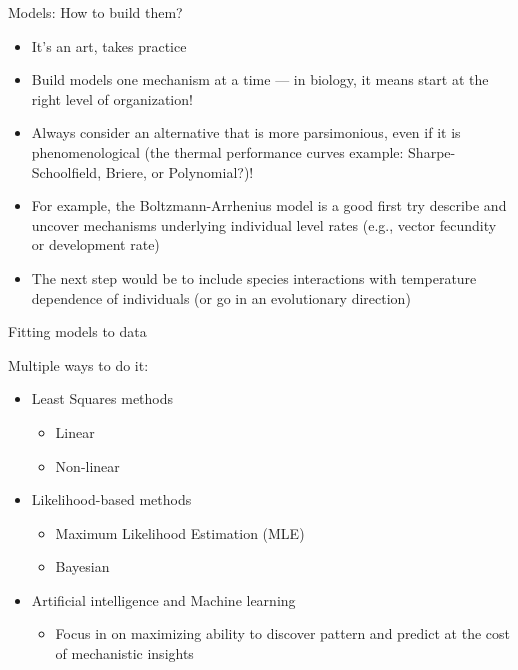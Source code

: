\documentclass[xcolor=x11names,compress]{beamer}
\renewcommand{\(}{\begin{columns}}
\renewcommand{\)}{\end{columns}}
\newcommand{\<}[1]{\begin{column}{#1}}
\renewcommand{\>}{\end{column}}
\begin{document}

\begin{frame}{Models: How to build them?}

\begin{itemize}\itemsep10pt

	\item It's an art, takes practice 
	\item Build models one mechanism at a time --- in biology, it means 
	start at the right level of organization! 
	\item Always consider an alternative that is more parsimonious, even if 
	it is phenomenological (the thermal performance curves example: Sharpe-Schoolfield, Briere, or Polynomial?)! 

	\item For example, the Boltzmann-Arrhenius model is a good first try 
	describe and uncover mechanisms underlying individual level rates (e.g., vector fecundity or development rate)  

	\item The next step would be to include species interactions with  
	temperature dependence of individuals (or go in an evolutionary direction)

\end{itemize}   

\end{frame}

\begin{frame}{Fitting models to data}

Multiple ways to do it:

\begin{itemize}\itemsep10pt

	\item Least Squares methods
	\begin{itemize}
		 \item Linear 
		 \item Non-linear
	\end{itemize}
	\item Likelihood-based methods 
	\begin{itemize}
	 \item Maximum Likelihood Estimation (MLE) 
	 \item Bayesian
	\end{itemize}
	\item Artificial intelligence and Machine learning
	\begin{itemize}
		\item  Focus in on maximizing ability to discover pattern and predict at the cost of mechanistic insights
	\end{itemize}


\end{itemize}

\end{frame}
\end{document}
